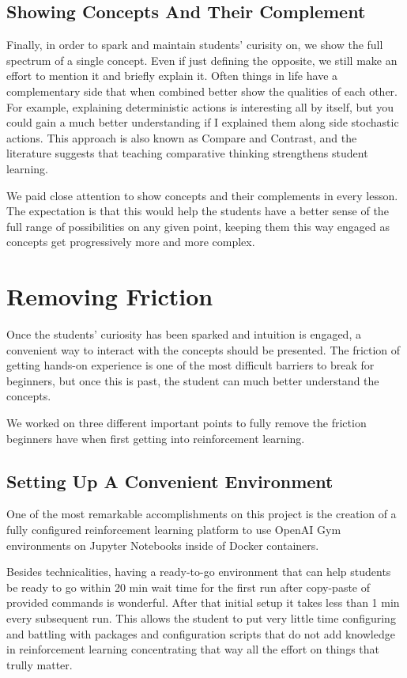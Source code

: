 \documentclass[11pt]{article} %
\begin{document}
\subsection{Showing Concepts And Their Complement}

Finally, in order to spark and maintain students' curisity on, we show the
full spectrum of a single concept. Even if just defining the opposite, we
still make an effort to mention it and briefly explain it. Often things in
life have a complementary side that when combined better show the qualities
of each other. For example, explaining deterministic actions is interesting
all by itself, but you could gain a much better understanding if I explained
them along side stochastic actions. This approach is also known as Compare and
Contrast, and the literature suggests that teaching comparative thinking
strengthens student learning\cite{compare}.

We paid close attention to show concepts and their complements in every
lesson. The expectation is that this would help the students have a better
sense of the full range of possibilities on any given point, keeping them
this way engaged as concepts get progressively more and more complex.

\section{Removing Friction}

Once the students' curiosity has been sparked and intuition is engaged, a
convenient way to interact with the concepts should be presented. The
friction of getting hands-on experience is one of the most difficult
barriers to break for beginners, but once this is past, the student can
much better understand the concepts.

We worked on three different important points to fully remove the friction
beginners have when first getting into reinforcement learning.

\subsection{Setting Up A Convenient Environment}

One of the most remarkable accomplishments on this project is the creation
of a fully configured reinforcement learning platform to use OpenAI
Gym \cite{openaigym} environments on Jupyter Notebooks inside of Docker
containers.

Besides technicalities, having a ready-to-go environment that can help
students be ready to go within 20 min wait time for the first run after
copy-paste of provided commands is wonderful. After that initial setup
it takes less than 1 min every subsequent run. This allows the student to put
very little time configuring and battling with packages and configuration
scripts that do not add knowledge in reinforcement learning concentrating
that way all the effort on things that trully matter.
\end{document}
